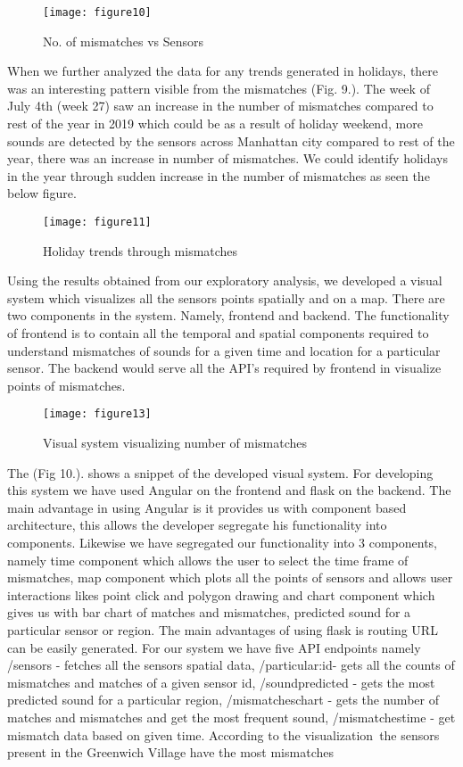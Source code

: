 	\begin{figure}[h!]
		\centering
		\texttt{[image: figure10]}
		\caption{No. of mismatches vs Sensors}
	\end{figure}

	When we further analyzed the data for any trends generated in holidays, there was an interesting pattern visible from the mismatches (Fig. 9.). The week of July 4th (week 27) saw an increase in the number of mismatches compared to rest of the year in 2019 which could be as a result of holiday weekend, more sounds are detected by the sensors across Manhattan city compared to rest of the year, there was an increase in number of mismatches. We could identify holidays in the year through sudden increase in the number of mismatches as seen the below figure.

	\begin{figure}[h!]
		\centering
		\texttt{[image: figure11]}
		\caption{Holiday trends through mismatches}
	\end{figure}
	
	Using the results obtained from our exploratory analysis, we developed a visual system which visualizes all the sensors points spatially and on a map. There are two components in the system. Namely, frontend and backend. The functionality of frontend is to contain all the temporal and spatial components required to understand mismatches of sounds for a given time and location for a particular sensor.  The backend would serve all the API's required by frontend in visualize points of mismatches.
	
	\begin{figure}[h!]
	\centering
	\texttt{[image: figure13]}
	\caption{Visual system visualizing number of mismatches}
	\end{figure}
	
	The (Fig 10.). shows a snippet of the developed visual system. For developing this system we have used Angular on the frontend and flask on the backend. The main advantage in using Angular is it provides us with component based architecture, this allows the developer segregate his functionality into components. Likewise we have segregated our functionality into 3 components, namely time component which allows the user to select the time frame of mismatches, map component which plots all the points of sensors and allows user interactions likes point click and polygon drawing and chart component which gives us with bar chart of matches and mismatches, predicted sound for a particular sensor or region. The main advantages of using flask is routing URL can be easily generated. For our system we have five API endpoints namely /sensors - fetches all the sensors spatial data, /particular:id- gets all the counts of mismatches and matches of a given sensor id, /soundpredicted - gets the most predicted sound for a particular region, /mismatcheschart - gets the number of matches and mismatches and get the most frequent sound, /mismatchestime - get mismatch data based on given time. According to the visualization the sensors present in the Greenwich Village have the most mismatches
	
	